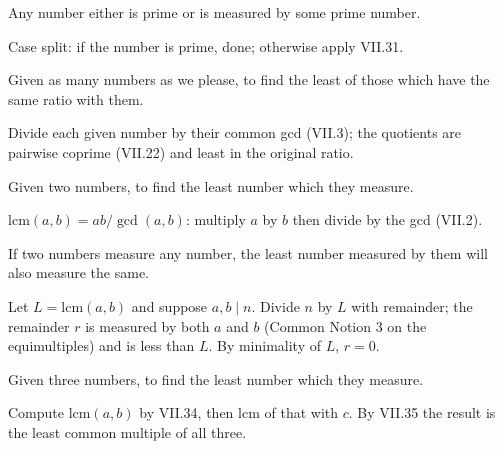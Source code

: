 \documentclass{rrxiv}
\begin{document}
\begin{claim}
\label{prop:VII.32}
Any number either is prime or is measured by some prime number.
\end{claim}
\begin{evidence}
\label{ev:VII.32}
Case split: if the number is prime, done; otherwise apply VII.31.
\end{evidence}

\begin{claim}
\label{prop:VII.33}
Given as many numbers as we please, to find the least of those which
have the same ratio with them.
\end{claim}
\begin{evidence}
\label{ev:VII.33}
Divide each given number by their common gcd (VII.3); the quotients
are pairwise coprime (VII.22) and least in the original ratio.
\end{evidence}

\begin{claim}
\label{prop:VII.34}
Given two numbers, to find the least number which they measure.
\end{claim}
\begin{evidence}
\label{ev:VII.34}
$\mathrm{lcm}(a, b) = ab / \gcd(a, b)$: multiply $a$ by $b$ then
divide by the gcd (VII.2).
\end{evidence}

\begin{claim}
\label{prop:VII.35}
If two numbers measure any number, the least number measured by them
will also measure the same.
\end{claim}
\begin{evidence}
\label{ev:VII.35}
Let $L = \mathrm{lcm}(a, b)$ and suppose $a, b \mid n$.  Divide $n$
by $L$ with remainder; the remainder $r$ is measured by both $a$ and
$b$ (Common Notion 3 on the equimultiples) and is less than $L$.  By
minimality of $L$, $r = 0$.
\end{evidence}

\begin{claim}
\label{prop:VII.36}
Given three numbers, to find the least number which they measure.
\end{claim}
\begin{evidence}
\label{ev:VII.36}
Compute $\mathrm{lcm}(a, b)$ by VII.34, then $\mathrm{lcm}$ of that
with $c$.  By VII.35 the result is the least common multiple of all
three.
\end{evidence}
\end{document}
